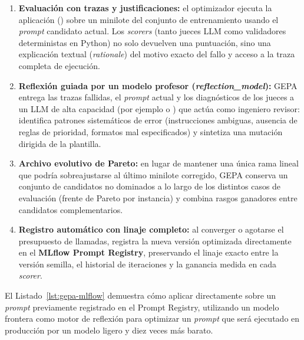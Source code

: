 \begin{enumerate}
  \item \textbf{Evaluación con trazas y justificaciones:} el optimizador ejecuta la aplicación () sobre un minilote del conjunto de entrenamiento usando el \textit{prompt} candidato actual. Los \textit{scorers} (tanto jueces LLM como validadores deterministas en Python) no solo devuelven una puntuación, sino una explicación textual (\textit{rationale}) del motivo exacto del fallo y acceso a la traza completa de ejecución.
  \item \textbf{Reflexión guiada por un modelo profesor (\textit{reflection\_model}):} GEPA entrega las trazas fallidas, el \textit{prompt} actual y los diagnósticos de los jueces a un LLM de alta capacidad (por ejemplo  o ) que actúa como ingeniero revisor: identifica patrones sistemáticos de error (instrucciones ambiguas, ausencia de reglas de prioridad, formatos mal especificados) y sintetiza una mutación dirigida de la plantilla.
  \item \textbf{Archivo evolutivo de Pareto:} en lugar de mantener una única rama lineal que podría sobreajustarse al último minilote corregido, GEPA conserva un conjunto de candidatos no dominados a lo largo de los distintos casos de evaluación (frente de Pareto por instancia) y combina rasgos ganadores entre candidatos complementarios.
  \item \textbf{Registro automático con linaje completo:} al converger o agotarse el presupuesto de llamadas,  registra la nueva versión optimizada directamente en el \textbf{MLflow Prompt Registry}, preservando el linaje exacto entre la versión semilla, el historial de iteraciones y la ganancia medida en cada \textit{scorer}.
\end{enumerate}

El Listado~\ref{lst:gepa-mlflow} demuestra cómo aplicar  directamente sobre un \textit{prompt} previamente registrado en el Prompt Registry, utilizando un modelo frontera como motor de reflexión para optimizar un \textit{prompt} que será ejecutado en producción por un modelo ligero y diez veces más barato.

